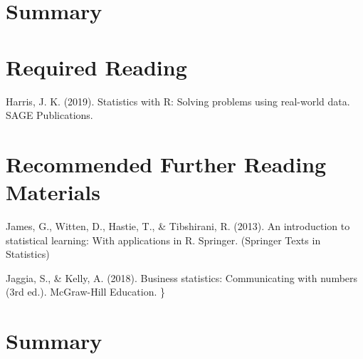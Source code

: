 \documentclass[
  letterpaper,
  DIV=11,
  numbers=noendperiod]{scrreprt}
\begin{document}

\chapter{Summary}\label{summary-8}


\chapter{Required Reading}\label{required-reading}

Harris, J. K. (2019). Statistics with R: Solving problems using
real-world data. SAGE Publications.


\chapter{Recommended Further Reading
Materials}\label{recommended-further-reading-materials}

James, G., Witten, D., Hastie, T., \& Tibshirani, R. (2013). An
introduction to statistical learning: With applications in R. Springer.
(Springer Texts in Statistics)

Jaggia, S., \& Kelly, A. (2018). Business statistics: Communicating with
numbers (3rd ed.). McGraw-Hill Education. \}


\chapter{Summary}\label{summary-9}
\end{document}
